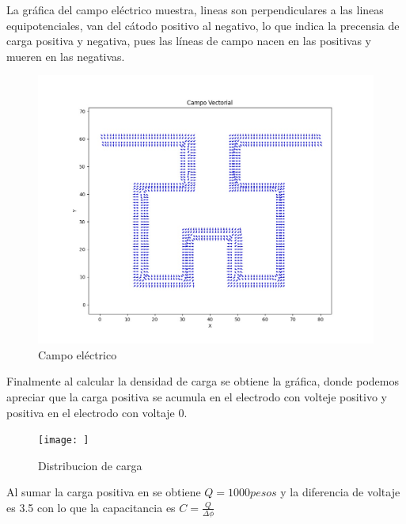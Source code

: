 La gráfica del campo eléctrico muestra, lineas son perpendiculares a las lineas equipotenciales, van del cátodo positivo al negativo, lo que indica la precensia de carga positiva y negativa, pues las líneas de campo nacen en las positivas y mueren en las negativas.  


\begin{figure}[H]
\centering
    \includegraphics[width=1.2\columnwidth]{img/Campo.jpg}
    \caption{Campo eléctrico}
    \label{fig:equipV}
\end{figure}

Finalmente al calcular la densidad de carga se obtiene la gráfica, donde podemos apreciar que la carga positiva se acumula en el electrodo con volteje positivo y positiva en el electrodo con voltaje 0.  

\begin{figure}[H]
\centering
    \texttt{[image: ]}
    \caption{Distribucion de carga}
    \label{fig:equipV}
\end{figure}

Al sumar la carga positiva en se obtiene $Q= 1000 pesos $ y la diferencia de voltaje es 3.5 con lo que la capacitancia es $C=\frac{Q}{\Delta\phi}$
